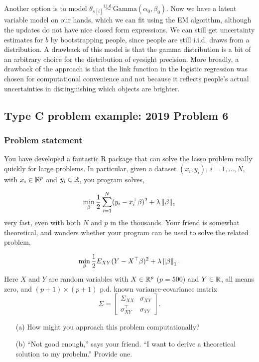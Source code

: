 Another option is to model $\theta_{s[i]} \overset{\text{i.i.d.}}{\sim} \text{Gamma}(\alpha_0, \beta_0)$. Now we have a latent variable model on our hands, which we can fit using the EM algorithm, although the updates do not have nice closed form expressions. We can still get uncertainty estimates for $b$ by bootstrapping people, since people are still i.i.d. draws from a distribution. A drawback of this model is that the gamma distribution is a bit of an arbitrary choice for the distribution of eyesight precision. More broadly, a drawback of the approach is that the link function in the logistic regression was chosen for computational convenience and not because it reflects people's actual uncertainties in distinguishing which objects are brighter.

\subsection{Type C problem example: 2019 Problem 6}\label{sec:case_study_2}

\subsubsection*{Problem statement}

You have developed a fantastic R package that can solve the lasso problem really quickly for large problems. In particular, given a dataset $(x_i,y_i)$, $i=1,\ldots,N$, with $x_i \in {\mathbb R}^p$ and $y_i \in {\mathbb R}$, you program solves,

\[\min_\beta \frac{1}{2}\sum_{i=1}^N (y_i - x_i^\top \beta)^2 + \lambda \left \lVert \beta \right \rVert_1 \]
very fast, even with both $N$ and $p$ in the thousands. Your friend is somewhat theoretical, and wonders whether your program can be used to solve the related problem,


\[\min_\beta \frac{1}{2}E_{XY}(Y-X^\top\beta)^2 + \lambda \left \lVert \beta \right \rVert_1. \]
 Here $X$ and $Y$ are random variables with $X \in {\mathbb R}^p$ ($p=500$) and $Y \in {\mathbb R}$, all means zero, and $(p+1) \times (p+1)$ p.d. known variance-covariance matrix
 \[\Sigma = \begin{bmatrix}
	\Sigma_{XX}&\sigma_{XY}\\
	\sigma^\top_{XY} & \sigma_{YY}
 \end{bmatrix}. \]
 \begin{enumerate}
	\item[(a)] How might you approach this problem computationally?
	\item[(b)] ``Not good enough,'' says your friend. ``I want to derive a theoretical solution to my probelm.'' Provide one.  
 \end{enumerate}

